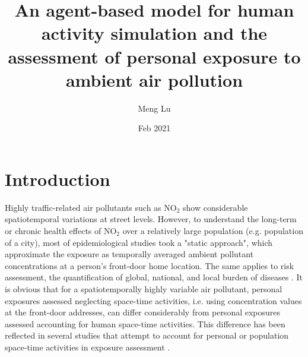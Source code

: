 \documentclass[]{article}
\author{Meng Lu }
\date{Feb 2021}
\title{An agent-based model for human activity simulation and the assessment of personal exposure to ambient air pollution}
\begin{document}
\maketitle
 
\section{Introduction}

Highly traffic-related air pollutants such as NO$_2$ show considerable spatiotemporal variations at street levels. However, to understand the long-term or chronic health effects of NO$_2$ over a relatively large population (e.g. population of a city), most of epidemiological studies took a "static approach", which approximate the exposure as temporally averaged ambient pollutant concentrations at a person’s front-door home location. The same applies to risk assessment, the quantification of global, national, and local burden of diseases \citep{achakulwisut2019global}. It is obvious that for a spatiotemporally highly variable air pollutant, personal exposures assessed neglecting space-time activities, i.e. using concentration values at the front-door addresses, can differ considerably from personal exposures assessed accounting for human space-time activities. This difference has been reflected in several studies that attempt to account for personal or population space-time activities in exposure assessment  \citep{duan1997combination,lu2019activity,park2017individual,molter2012performance,zenk2011activity}. 
\end{document}

